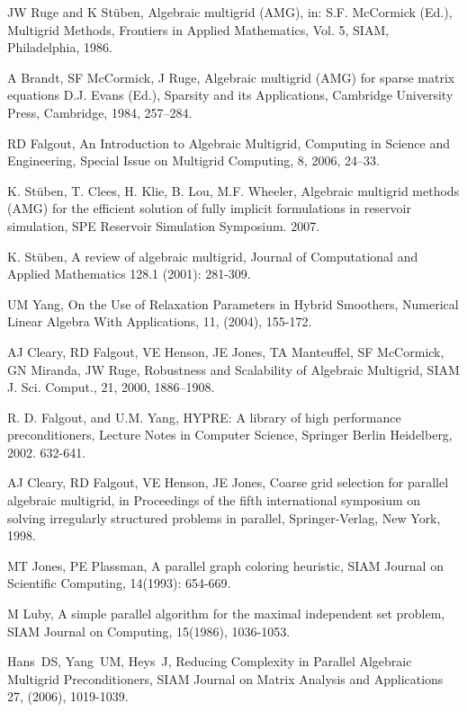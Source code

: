 \documentclass[12pt]{book}
\begin{document}
\begin{thebibliography}{00}
{JW Ruge and K St\"{u}ben}, {Algebraic multigrid (AMG)},
in: S.F. McCormick (Ed.), Multigrid Methods, Frontiers in Applied Mathematics, Vol. 5, SIAM, Philadelphia, 1986.

{A Brandt, SF McCormick, J Ruge},
Algebraic multigrid (AMG) for sparse matrix equations
D.J. Evans (Ed.), Sparsity and its Applications, Cambridge University Press, Cambridge, 1984, 257--284.

RD Falgout, An Introduction to Algebraic Multigrid, Computing in Science and Engineering,
Special Issue on Multigrid Computing, 8, 2006, 24--33.

K. St\"{u}ben, T. Clees, H. Klie, B. Lou, M.F. Wheeler,
Algebraic multigrid methods (AMG) for the efficient solution of fully implicit formulations in reservoir simulation,
SPE Reservoir Simulation Symposium. 2007.

K. St\"{u}ben,
A review of algebraic multigrid,
Journal of Computational and Applied Mathematics 128.1 (2001): 281-309.

UM Yang, On the Use of Relaxation Parameters in Hybrid Smoothers,
Numerical Linear Algebra With Applications, 11, (2004), 155-172.

{AJ Cleary, RD Falgout, VE Henson, JE Jones, TA Manteuffel, SF McCormick,
GN Miranda, JW Ruge}, {Robustness and Scalability of Algebraic Multigrid}, SIAM J. Sci. Comput., 21, 2000, 1886--1908.

R. D. Falgout, and U.M. Yang, HYPRE: A library of high performance preconditioners,
Lecture Notes in Computer Science, Springer Berlin Heidelberg, 2002. 632-641.

AJ Cleary, RD Falgout, VE Henson, JE Jones, Coarse grid selection for parallel algebraic multigrid, in Proceedings of the
fifth international symposium on solving irregularly structured problems in parallel, Springer-Verlag, New York, 1998.

MT Jones, PE Plassman, A parallel graph coloring heuristic, SIAM Journal on Scientific Computing, 14(1993): 654-669.

M Luby, A simple parallel algorithm for the maximal independent set problem,
SIAM Journal on Computing, 15(1986), 1036-1053.

Hans~DS, Yang~UM, Heys~J,
Reducing Complexity in Parallel Algebraic Multigrid Preconditioners,
SIAM Journal on Matrix Analysis and Applications 27, (2006), 1019-1039.
\end{thebibliography}
\end{document}
